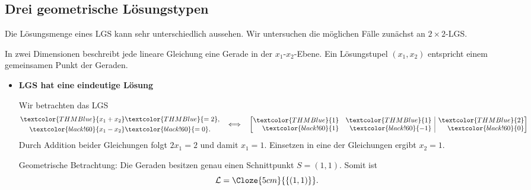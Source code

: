 \subsection{Drei geometrische Lösungstypen}
\label{subsec:linear_systems_solution_sets_and_geometry}

Die Lösungsmenge eines LGS kann sehr unterschiedlich aussehen. Wir
untersuchen die möglichen Fälle zunächst an $2\times2$-LGS.

In zwei Dimensionen beschreibt jede lineare Gleichung eine Gerade in der
$x_1$-$x_2$-Ebene. Ein Lösungstupel $(x_1,x_2)$ entspricht einem gemeinsamen
Punkt der Geraden.
\begin{itemize}[leftmargin=1.6em,itemsep=1.2em]
  \item
    \begin{minipage}[t]{\linewidth}
    \textbf{LGS hat eine eindeutige Lösung}\par\smallskip
    \noindent
    \begin{minipage}[c]{0.64\linewidth}
      Wir betrachten das LGS
      \[
        \begin{aligned}
          \textcolor{THMBlue}{x_1+x_2}&\textcolor{THMBlue}{=2},\\
          \textcolor{black!60}{x_1-x_2}&\textcolor{black!60}{=0}.
        \end{aligned}
        \quad\Longleftrightarrow\quad
        \left[
          \begin{array}{@{}rr|r@{}}
            \textcolor{THMBlue}{1}&\textcolor{THMBlue}{1}&\textcolor{THMBlue}{2}\\
            \textcolor{black!60}{1}&\textcolor{black!60}{-1}&\textcolor{black!60}{0}
          \end{array}
        \right]
      \]
      Durch Addition beider Gleichungen folgt $2x_1=2$ und damit $x_1=1$.
      Einsetzen in eine der Gleichungen ergibt $x_2=1$.

      \smallskip
      Geometrische Betrachtung: Die Geraden besitzen genau einen
      Schnittpunkt $S=(1,1)$. Somit ist
      \[
        \mathcal{L}=\Cloze{5cm}{\{(1,1)\}}.
      \]
    \end{minipage}\hfill
    \begin{minipage}[c]{0.32\linewidth}
      \centering
    \end{minipage}
    \end{minipage}


\end{itemize}
